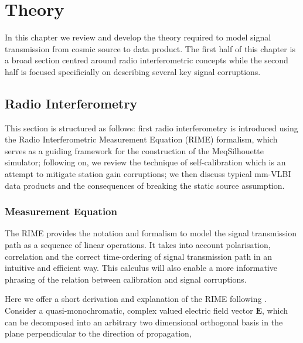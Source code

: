 \chapter{Theory}\label{chap:theory}
In this chapter we review and develop the theory required to model signal transmission from cosmic source to data product. The first half of this chapter is a broad section centred around radio interferometric concepts while the second half is focused specificially on describing several key signal corruptions. 

\section{Radio Interferometry}\label{sec:radio_int}

This section is structured as follows: first radio interferometry is introduced using the Radio Interferometric Measurement Equation (RIME) formalism, which serves as a guiding framework for the construction of the {\sc MeqSilhouette} simulator; following on, we review the technique of self-calibration which is an attempt to mitigate station gain corruptions; we then discuss typical mm-VLBI data products and the consequences of breaking the static source assumption.

\subsection{Measurement Equation}\label{sec:RIME}

The RIME provides the notation and formalism to model the signal transmission path as a sequence of linear operations. It takes into account polarisation, correlation and the correct time-ordering of signal transmission path in an intuitive and efficient way. This calculus will also enable a more informative phrasing of the relation between calibration and signal corruptions.


Here we offer a short derivation and explanation of the RIME following \citet{Smirnov_2011a}. Consider a quasi-monochromatic, complex valued electric field vector $\bm{E}$, which can be decomposed into an arbitrary two dimensional orthogonal basis in the plane perpendicular to the direction of propagation,

